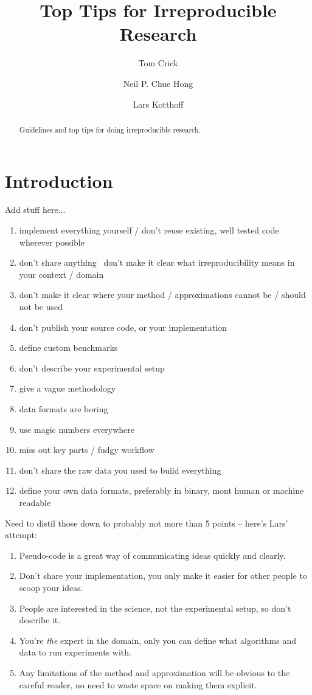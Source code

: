 \documentclass[a4paper,11pt]{article}
\title{Top Tips for Irreproducible Research}
\author[1]{Tom Crick}
\author[2]{Neil P. Chue Hong}
\author[3]{Lars Kotthoff}
\affil[1]{Department of Computing \& Information Systems, Cardiff
  Metropolitan University}
\affil[2]{Software Sustainability Institute, University of Edinburgh}
\affil[3]{Insight Centre for Data Analytics, University College Cork}
\affil[1]{\protect\url{tcrick@cardiffmet.ac.uk}}
\affil[2]{\protect\url{N.ChueHong@software.ac.uk}}
\affil[3]{\protect\url{lars.kotthoff@insight-centre.org}}
\date{ }
\begin{document}
\maketitle

\begin{abstract}
Guidelines and top tips for doing irreproducible research.
\end{abstract}

\section{Introduction}
Add stuff here...


\begin{enumerate}
\item implement everything yourself / don't reuse existing, well tested code wherever possible
\item  don't share anything
\ don't make it clear what irreproducibility means in your context / domain
\item don't make it clear where your method / approximations cannot be / should not be used
\item don't publish your source code, or your implementation
\item  define custom benchmarks
\item  don't describe your experimental setup
\item  give a vague methodology
\item  data formats are boring
\item  use magic numbers everywhere
\item  miss out key parts / fudgy workflow
\item  don't share the raw data you used to build everything
\item  define your own data formats, preferably in binary, mont human or machine readable
\end{enumerate}

Need to distil those down to probably not more than 5 points -- here's Lars'
attempt:
\begin{enumerate}
\item Pseudo-code is a great way of communicating ideas quickly and clearly.
\item Don't share your implementation, you only make it easier for other people
to scoop your ideas.
\item People are interested in the science, not the experimental setup, so don't
describe it.
\item You're \emph{the} expert in the domain, only you can define what
algorithms and data to run experiments with.
\item Any limitations of the method and approximation will be obvious to the
careful reader, no need to waste space on making them explicit.
\end{enumerate}
\end{document}
